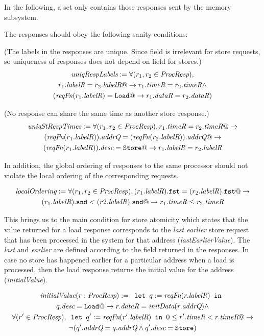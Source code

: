In the following, a \Response{} set only contains those responses sent by the
memory subsystem.

The responses should obey the following sanity conditions:

\begin{defn} (The labels in the responses are unique. Since \dataR{} field is
irrelevant for store requests, so uniqueness of responses does not depend on
\dataR{} field for stores.)
\begin{multline*}
\textit{uniqRespLabels} := \forall (r_1, r_2 \in \textit{ProcResp}),\\
r_1.\textit{labelR} = r_2.\textit{labelR} @-> r_1.\textit{timeR} = r_2.\textit{timeR} \wedge\\
(\textit{reqFn}(r_1.\textit{labelR}) = \texttt{Load} @-> r_1.\textit{dataR} = r_2.\textit{dataR})
\end{multline*}
\end{defn}

\begin{defn} (No response can share the same time as another store response.)
\begin{multline*}
\textit{uniqStRespTimes} := 
\forall (r_1, r_2 \in \textit{ProcResp}),
r_1.\textit{timeR} = r_2.\textit{timeR} @-> \\
(\textit{reqFn} (r_1.\textit{labelR})).\textit{addrQ} = (\textit{reqFn} (r_2.\textit{labelR})).\textit{addrQ} @->\\
(\textit{reqFn} (r_1.\textit{labelR})).\textit{desc} = \texttt{Store} @->
r_1.\textit{labelR} = r_2.\textit{labelR}
\end{multline*}
\end{defn}

In addition, the global ordering of responses to the same processor should not
violate the local ordering of the corresponding requests.
\begin{defn}
\begin{multline*}
\textit{localOrdering} :=
\forall (r_1, r_2 \in \textit{ProcResp}), (r_1.\textit{labelR}).\texttt{fst} = (r_2.\textit{labelR}).\texttt{fst} @->\\
(r_1.\textit{labelR}).\texttt{snd} < (r2.\textit{labelR}).\texttt{snd} @-> r_1.\textit{timeR} \le r_2.\textit{timeR}
\end{multline*}
\end{defn}

This brings us to the main condition for store atomicity which states that the
value returned for a load response corresponds to the \emph{last earlier} store
request that has been processed in the system for that address
(\textit{lastEarlierValue}). The \emph{last} and \emph{earlier} are defined
according to the field \timeR{} returned in the responses. In case no store has
happened earlier for a particular address when a load is processed, then the
load response returns the initial value for the address (\textit{initialValue}).
\begin{defn}
\begin{multline*}
\textit{initialValue} (r: \textit{ProcResp}) := \texttt{ let } q := \textit{reqFn} (r.\textit{labelR}) \texttt{ in }\\
q.\textit{desc} = \texttt{Load} @-> r.\textit{dataR} = \textit{initData} (r.\textit{addrQ}) \wedge \\
\forall (r' \in \textit{ProcResp}), \texttt{ let } q' := \textit{reqFn} (r'.\textit{labelR}) \texttt{ in } 0 \le r'.\textit{timeR} < r.\textit{timeR} @->\\
\neg (q'.\textit{addrQ} = q.\textit{addrQ} \wedge q'.\textit{desc} = \texttt{Store})
\end{multline*}
\end{defn}

